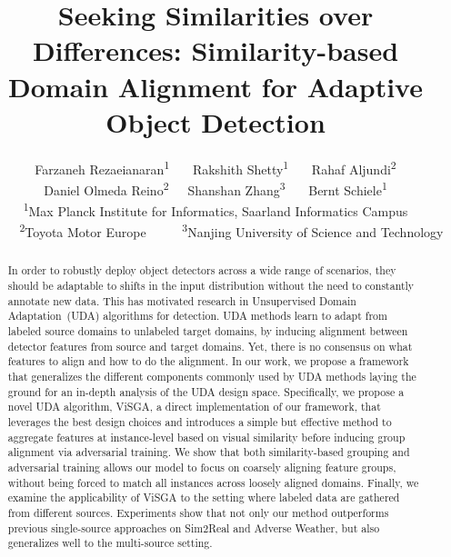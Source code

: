 \documentclass[10pt,twocolumn,letterpaper]{article}
\def\ourda{ViSGA\xspace}
\begin{document}
\title{Seeking Similarities over Differences: Similarity-based Domain Alignment for Adaptive Object Detection}

\author{
	Farzaneh Rezaeianaran\textsuperscript{1} \ \ \ 
	Rakshith Shetty\textsuperscript{1} \ \ \ 
	Rahaf Aljundi\textsuperscript{2} \\
	Daniel Olmeda Reino\textsuperscript{2}\ \ \ 
	Shanshan Zhang\textsuperscript{3} \ \ \ 
	Bernt Schiele\textsuperscript{1} \\
	\small \textsuperscript{1}Max Planck Institute for Informatics, Saarland Informatics Campus \ \ \ \ \ \textsuperscript{2}Toyota Motor Europe \ \ \ \ \
	\textsuperscript{3}Nanjing University of Science and Technology
}





\maketitle
\ificcvfinal\thispagestyle{empty}\fi
\begin{abstract}
In order to robustly deploy object detectors across a wide range of scenarios, they should be adaptable to shifts in the input distribution without the need to constantly annotate new data. 
This has motivated research in Unsupervised Domain Adaptation~(UDA) algorithms for detection.
UDA methods learn to adapt from labeled source domains to unlabeled target domains, by inducing alignment between detector features from source and target domains. 
Yet, there is no consensus on what features to align and how to do the alignment.
In our work, we propose a framework that generalizes the different components commonly used by UDA methods laying the ground for an in-depth analysis of the UDA design space.
Specifically, we propose a novel UDA algorithm, \ourda, a direct implementation of our framework, that leverages the best design choices and introduces a simple but effective method to aggregate features at instance-level based on visual similarity before inducing group alignment via adversarial training.
We show that both similarity-based grouping and adversarial training allows our model to focus on coarsely aligning feature groups, without being forced to match all instances across loosely aligned domains.
Finally, we examine the applicability of \ourda to the setting where labeled data are gathered from different sources.
Experiments show that not only our method outperforms previous single-source approaches on Sim2Real and Adverse Weather, but also generalizes well to the multi-source setting.
\end{abstract}
\end{document}
